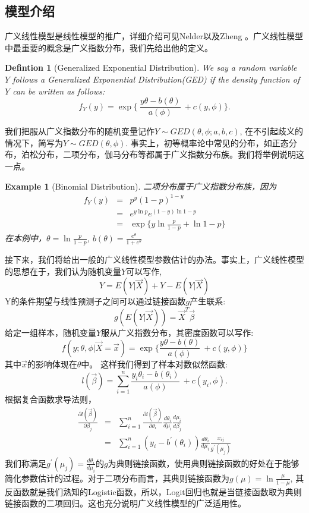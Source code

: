 \documentclass[12pt]{article}
\newtheorem{Definition}{Defintion}[section]
\newtheorem{Example}{Example}[section]
\begin{document}
\subsection{模型介绍}
广义线性模型是线性模型的推广，详细介绍可见Nelder\cite{nelder1972generalized}以及Zheng \cite{zheng2000summarizing}。广义线性模型中最重要的概念是广义指数分布，我们先给出他的定义。
\begin{Definition}[Generalized Exponential Distribution]{\label{GED}} We say a random variable $Y$ follows a Generalized Exponential Distribution(GED) if the density function of 
$Y$ can be written as follows:
$$
f_Y(y) = \exp \{\ \frac{y\theta-b(\theta)}{a(\phi)}\ + c(y,\phi) \}.
$$
\end{Definition} \par
我们把服从广义指数分布的随机变量记作$Y \sim GED(\theta,\phi;a,b,c)$, 在不引起歧义的情况下，简写为$Y \sim GED(\theta,\phi)$. 事实上，初等概率论中常见的分布，如正态分布，泊松分布，二项分布，伽马分布等都属于广义指数分布族。我们将举例说明这一点。
\begin{Example}[Binomial Distribution]
二项分布属于广义指数分布族，因为
\begin{eqnarray*}
	f_Y(y) 
	&=& p^y(1-p)^{1-y} \\
	&=& e^{y\ln p} e^{(1-y) \ln 1-p}  \\
	&=& \exp\{y\ln \frac{p}{1-p}+\ln 1-p\}   
\end{eqnarray*}
在本例中，$\theta=\ln \frac{p}{1-p}$, $b(\theta)=\frac{e^{\theta}}{1+e^{\theta}}$
\end{Example}
接下来，我们将给出一般的广义线性模型参数估计的办法。事实上，广义线性模型的思想在于，我们认为随机变量$Y$可以写作, 
$$
Y = E(Y|\vec X) + Y - E(Y|\vec X)
$$
Y的条件期望与线性预测子之间可以通过链接函数$g$产生联系:
$$
g(E(Y|\vec X)) = \vec{X}^T\vec{\beta}
$$
给定一组样本，随机变量$Y$服从广义指数分布，其密度函数可以写作:
$$
f(y;\theta,\phi|\vec X=\vec x) = \exp \{\frac{y\theta-b(\theta)}{a(\phi)}\ + c(y,\phi)\}
$$
其中$\vec x$的影响体现在$\theta$中。
这样我们得到了样本对数似然函数:
$$
l(\vec \beta) = \sum_{i=1}^{n}   \frac{y_i\theta_i-b(\theta_i)}{a(\phi)}\ + c(y_i,\phi).
$$
根据复合函数求导法则，
\begin{eqnarray*}
	\frac{\partial l(\vec \beta)}{\partial \beta_j}
	 &=& \sum_{i=1}^{n} \frac{\partial l(\vec \beta)}{\partial \theta_i} \frac{d \theta_i}{d \mu_i} \frac{d \mu_i}{d \beta_j} \\ 
	 &=& \sum_{i=1}^{n} (y_i-b^{'}(\theta_i)) \frac{d \theta_i}{d \mu_i} \frac{x_{ij}}{g^{'}(\mu_j)}
\end{eqnarray*}
我们称满足$g^{'}(\mu_j) =  \frac{d \theta_i}{d \mu_i}$的$g$为典则链接函数，使用典则链接函数的好处在于能够简化参数估计的过程。对于二项分布而言，其典则链接函数为$g(\mu) = \ln \frac{\mu}{1-\mu}$, 其反函数就是我们熟知的Logistic函数，所以，Logit回归也就是当链接函数取为典则链接函数的二项回归。这也充分说明广义线性模型的广泛适用性。
\end{document}
